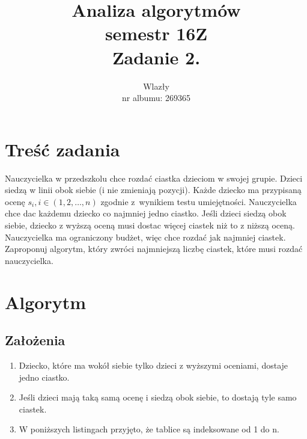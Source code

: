 \documentclass{article}
\title{\vspace{7cm}\LARGE Analiza algorytmów\\semestr 16Z\\Zadanie 2.}
\author{\LargeŁukasz Wlazły\\nr albumu: 269365}
\date{}
\begin{document}
	\maketitle
	\newpage

	\section{Treść zadania}

	Nauczycielka w przedszkolu chce rozdać ciastka dzieciom w swojej grupie. Dzieci siedzą w linii obok siebie (i nie zmieniają pozycji). Każde dziecko ma przypisaną ocenę $  s_{i}, i \in (1, 2, \ldots, n) $ zgodnie z~wynikiem testu umiejętności.
	Nauczycielka chce dac każdemu dziecko co najmniej jedno ciastko. Jeśli dzieci siedzą obok siebie, dziecko z wyższą oceną musi dostac więcej ciastek niż to z niższą oceną. Nauczycielka ma ograniczony budżet, więc chce rozdać jak najmniej ciastek. Zaproponuj algorytm, który zwróci najmniejszą liczbę ciastek, które musi rozdać nauczycielka.

	\section{Algorytm}

	\subsection{Założenia}

	\begin{enumerate}
		\item Dziecko, które ma wokół siebie tylko dzieci z wyższymi oceniami, dostaje jedno ciastko.
		\item Jeśli dzieci mają taką samą ocenę i siedzą obok siebie, to dostają tyle samo ciastek.
		\item W poniższych listingach przyjęto, że tablice są indeksowane od 1 do n.
	\end{enumerate}
\end{document}
